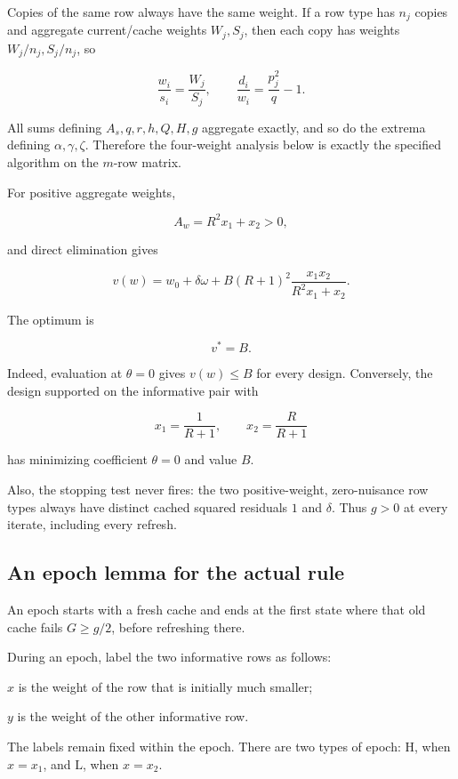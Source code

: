 Copies of the same row always have the same weight. If a row type has \(n_j\) copies and aggregate current/cache weights \(W_j,S_j\), then each copy has weights \(W_j/n_j,S_j/n_j\), so

\[
\frac{w_i}{s_i}=\frac{W_j}{S_j},
\qquad
\frac{d_i}{w_i}=\frac{p_j^2}{q}-1.
\]

All sums defining \(A_s,q,r,h,Q,H,g\) aggregate exactly, and so do the extrema defining \(\alpha,\gamma,\zeta\). Therefore the four-weight analysis below is exactly the specified algorithm on the \(m\)-row matrix.

For positive aggregate weights,

\[
A_w=R^2x_1+x_2>0,
\]

and direct elimination gives

\[
v(w)
=w_0+\delta\omega+
B(R+1)^2\frac{x_1x_2}{R^2x_1+x_2}.
\tag{T2}
\]

The optimum is

\[
\boxed{v^*=B.}
\tag{T3}
\]

Indeed, evaluation at \(\theta=0\) gives \(v(w)\le B\) for every design. Conversely, the design supported on the informative pair with

\[
x_1=\frac1{R+1},\qquad x_2=\frac R{R+1}
\]

has minimizing coefficient \(\theta=0\) and value \(B\).

Also, the stopping test never fires: the two positive-weight, zero-nuisance row types always have distinct cached squared residuals \(1\) and \(\delta\). Thus \(g>0\) at every iterate, including every refresh.



\subsection{An epoch lemma for the actual rule}

An epoch starts with a fresh cache and ends at the first state where that old cache fails \(G\ge g/2\), before refreshing there.

During an epoch, label the two informative rows as follows:

\(x\) is the weight of the row that is initially much smaller;\par
\(y\) is the weight of the other informative row.\par

The labels remain fixed within the epoch. There are two types of epoch: \(\mathrm H\), when \(x=x_1\), and \(\mathrm L\), when \(x=x_2\).

